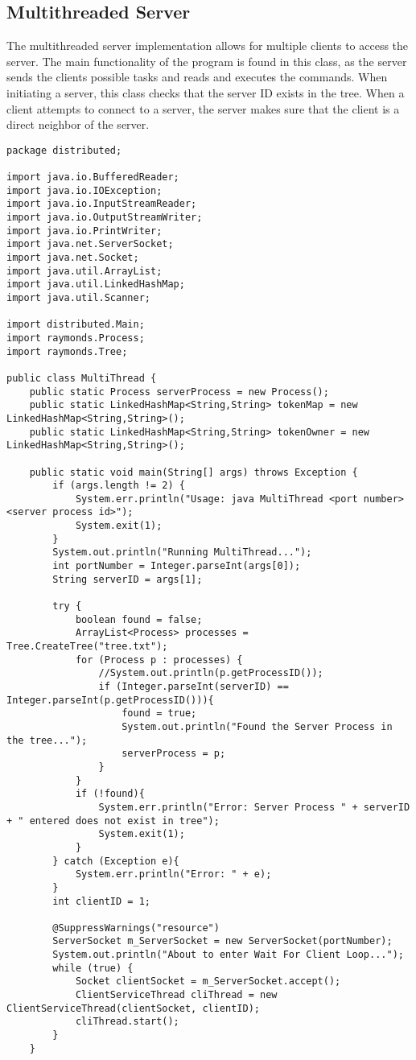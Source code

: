 \documentclass{article}
\begin{document}
	\subsection{Multithreaded Server}
	The multithreaded server implementation allows for multiple clients to access the server. The main functionality of the program is found in this class, as the server sends the clients possible tasks and reads and executes the commands. When initiating a server, this class checks that the server ID exists in the tree. When a client attempts to connect to a server, the server makes sure that the client is a direct neighbor of the server.
		\begin{lstlisting}
package distributed;

import java.io.BufferedReader;
import java.io.IOException;
import java.io.InputStreamReader;
import java.io.OutputStreamWriter;
import java.io.PrintWriter;
import java.net.ServerSocket;
import java.net.Socket;
import java.util.ArrayList;
import java.util.LinkedHashMap;
import java.util.Scanner;

import distributed.Main;
import raymonds.Process;
import raymonds.Tree;

public class MultiThread {
	public static Process serverProcess = new Process();
	public static LinkedHashMap<String,String> tokenMap = new LinkedHashMap<String,String>();
	public static LinkedHashMap<String,String> tokenOwner = new LinkedHashMap<String,String>();
	
	public static void main(String[] args) throws Exception {
		if (args.length != 2) {
			System.err.println("Usage: java MultiThread <port number> <server process id>");
			System.exit(1);
		}
		System.out.println("Running MultiThread...");
		int portNumber = Integer.parseInt(args[0]);
		String serverID = args[1];
		
		try {
			boolean found = false;
			ArrayList<Process> processes = Tree.CreateTree("tree.txt");
			for (Process p : processes) {
				//System.out.println(p.getProcessID());
				if (Integer.parseInt(serverID) == Integer.parseInt(p.getProcessID())){
					found = true;
					System.out.println("Found the Server Process in the tree...");
					serverProcess = p;
				}
			}
			if (!found){
				System.err.println("Error: Server Process " + serverID + " entered does not exist in tree");
				System.exit(1);
			}
		} catch (Exception e){
			System.err.println("Error: " + e);
		}		
		int clientID = 1;
		
		@SuppressWarnings("resource")
		ServerSocket m_ServerSocket = new ServerSocket(portNumber);
		System.out.println("About to enter Wait For Client Loop...");
		while (true) {
			Socket clientSocket = m_ServerSocket.accept();
			ClientServiceThread cliThread = new ClientServiceThread(clientSocket, clientID);
			cliThread.start();
		}
	}
	

\end{lstlisting}
\end{document}
